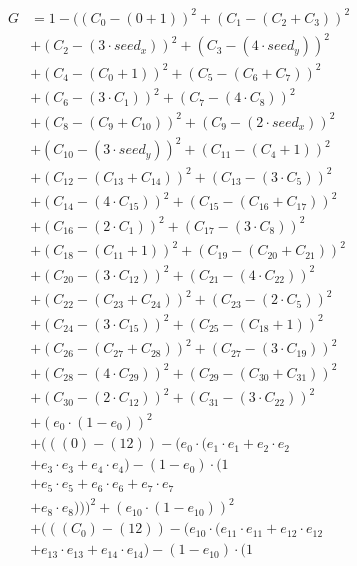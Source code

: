 \documentclass[10pt, a4paper]{article}
\begin{document}
\begin{small}
\begin{align*}
G &= 1 - ((C_{0} - (0 + 1))^{2} + (C_{1} - (C_{2} + C_{3}))^{2} \\
& + (C_{2} - (3  \cdot  seed_x))^{2} + (C_{3} - (4  \cdot  seed_y))^{2} \\
& + (C_{4} - (C_{0} + 1))^{2} + (C_{5} - (C_{6} + C_{7}))^{2} \\
& + (C_{6} - (3  \cdot  C_{1}))^{2} + (C_{7} - (4  \cdot  C_{8}))^{2} \\
& + (C_{8} - (C_{9} + C_{10}))^{2} + (C_{9} - (2  \cdot  seed_x))^{2} \\
& + (C_{10} - (3  \cdot  seed_y))^{2} + (C_{11} - (C_{4} + 1))^{2} \\
& + (C_{12} - (C_{13} + C_{14}))^{2} + (C_{13} - (3  \cdot  C_{5}))^{2} \\
& + (C_{14} - (4  \cdot  C_{15}))^{2} + (C_{15} - (C_{16} + C_{17}))^{2} \\
& + (C_{16} - (2  \cdot  C_{1}))^{2} + (C_{17} - (3  \cdot  C_{8}))^{2} \\
& + (C_{18} - (C_{11} + 1))^{2} + (C_{19} - (C_{20} + C_{21}))^{2} \\
& + (C_{20} - (3  \cdot  C_{12}))^{2} + (C_{21} - (4  \cdot  C_{22}))^{2} \\
& + (C_{22} - (C_{23} + C_{24}))^{2} + (C_{23} - (2  \cdot  C_{5}))^{2} \\
& + (C_{24} - (3  \cdot  C_{15}))^{2} + (C_{25} - (C_{18} + 1))^{2} \\
& + (C_{26} - (C_{27} + C_{28}))^{2} + (C_{27} - (3  \cdot  C_{19}))^{2} \\
& + (C_{28} - (4  \cdot  C_{29}))^{2} + (C_{29} - (C_{30} + C_{31}))^{2} \\
& + (C_{30} - (2  \cdot  C_{12}))^{2} + (C_{31} - (3  \cdot  C_{22}))^{2} \\
& + (e_{0} \cdot (1 - e_{0}))^{2} \\
& + (((0) - (12)) - (e_{0} \cdot (e_{1} \cdot e_{1} + e_{2} \cdot e_{2} \\
& + e_{3} \cdot e_{3} + e_{4} \cdot e_{4}) - (1 - e_{0}) \cdot (1 \\
& + e_{5} \cdot e_{5} + e_{6} \cdot e_{6} + e_{7} \cdot e_{7} \\
& + e_{8} \cdot e_{8})))^{2} + (e_{10} \cdot (1 - e_{10}))^{2} \\
& + (((C_{0}) - (12)) - (e_{10} \cdot (e_{11} \cdot e_{11} + e_{12} \cdot e_{12} \\
& + e_{13} \cdot e_{13} + e_{14} \cdot e_{14}) - (1 - e_{10}) \cdot (1 \\

\end{align*}
\end{small}
\end{document}
